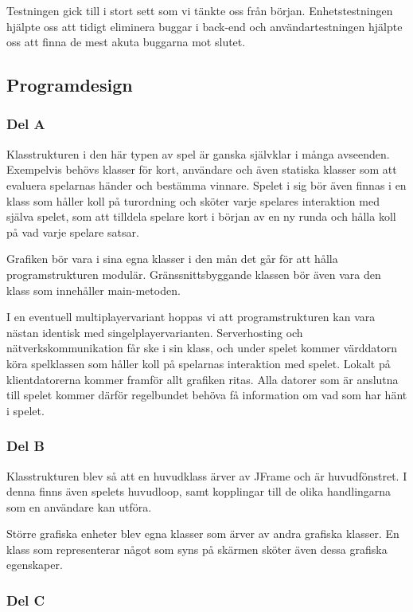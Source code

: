 \documentclass[10pt,a4paper]{article}
\begin{document}
Testningen gick till i stort sett som vi tänkte oss från början.
Enhetstestningen hjälpte oss att tidigt eliminera buggar i back-end och
användartestningen hjälpte oss att finna de mest akuta buggarna mot slutet.

\subsection*{Programdesign}

\subsubsection*{Del A}

Klasstrukturen i den här typen av spel är ganska självklar i många
avseenden. Exempelvis behövs klasser för kort, användare och även statiska
klasser som att evaluera spelarnas händer och bestämma vinnare. Spelet i
sig bör även finnas i en klass som håller koll på turordning och sköter
varje spelares interaktion med själva spelet, som att tilldela spelare kort
i början av en ny runda och hålla koll på vad varje spelare satsar.

Grafiken bör vara i sina egna klasser i den mån det går för att hålla
programstrukturen modulär. Gränssnittsbyggande klassen bör även vara den
klass som innehåller main-metoden.

I en eventuell multiplayervariant hoppas vi att programstrukturen kan vara
nästan identisk med singelplayervarianten. Serverhosting och
nätverkskommunikation får ske i sin klass, och under spelet kommer
värddatorn köra spelklassen som håller koll på spelarnas interaktion med
spelet. Lokalt på klientdatorerna kommer framför allt grafiken ritas. Alla
datorer som är anslutna till spelet kommer därför regelbundet behöva få
information om vad som har hänt i spelet.

\subsubsection*{Del B}

Klasstrukturen blev så att en huvudklass ärver av JFrame och är
huvudfönstret. I denna finns även spelets huvudloop, samt kopplingar till
de olika handlingarna som en användare kan utföra.

Större grafiska enheter blev egna klasser som ärver av andra grafiska
klasser. En klass som representerar något som syns på skärmen sköter även
dessa grafiska egenskaper.

\subsubsection*{Del C}
\end{document}
